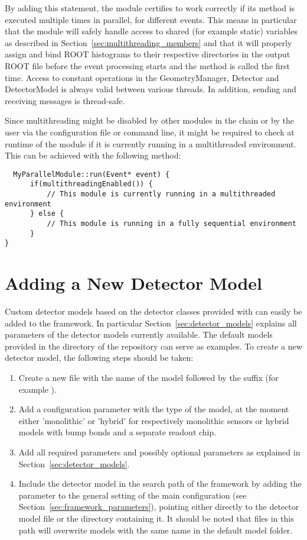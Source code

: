 By adding this statement, the module certifies to work correctly if its  method is executed multiple times in parallel, for different events.
This means in particular that the module will safely handle access to shared (for example static) variables as described in Section~\ref{sec:multithreading_members} and that it will properly assign and bind ROOT histograms to their respective directories in the output ROOT file before the event processing starts and the  method is called the first time.
Access to constant operations in the GeometryManager, Detector and DetectorModel is always valid between various threads. In addition, sending and receiving messages is thread-safe.

Since multithreading might be disabled by other modules in the chain or by the user via the configuration file or command line, it might be required to check at runtime of the module if it is currently running in a multithreaded environment. This can be achieved with the following method:
\begin{verbatim}
  MyParallelModule::run(Event* event) {
      if(multithreadingEnabled()) {
          // This module is currently running in a multithreaded environment
      } else {
          // This module is running in a fully sequential environment
      }
}
\end{verbatim}


\section{Adding a New Detector Model}
\label{sec:adding_detector_model}
Custom detector models based on the detector classes provided with \apsq can easily be added to the framework.
In particular Section~\ref{sec:detector_models} explains all parameters of the detector models currently available.
The default models provided in the  directory of the repository can serve as examples.
To create a new detector model, the following steps should be taken:
\begin{enumerate}
\item Create a new file with the name of the model followed by the  suffix (for example ).
\item Add a configuration parameter  with the type of the model, at the moment either 'monolithic' or 'hybrid' for respectively monolithic sensors or hybrid models with bump bonds and a separate readout chip.
\item Add all required parameters and possibly optional parameters as explained in Section~\ref{sec:detector_models}.
\item Include the detector model in the search path of the framework by adding the  parameter to the general setting of the main configuration (see Section~\ref{sec:framework_parameters}), pointing either directly to the detector model file or the directory containing it. It should be noted that files in this path will overwrite models with the same name in the default model folder.
\end{enumerate}

